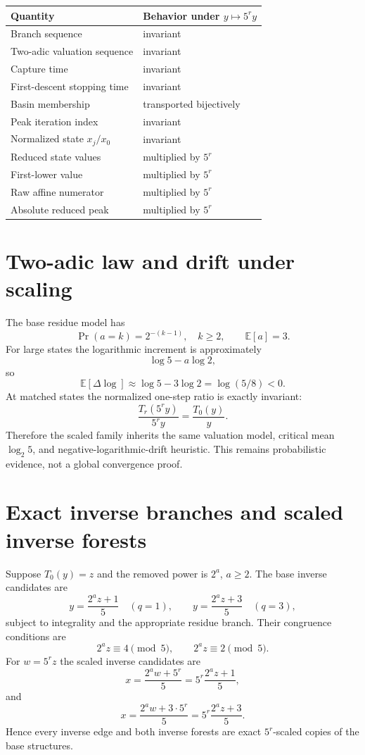 \documentclass[11pt]{article}
\theoremstyle{remark}\newtheorem{remark}{Remark}
\begin{document}
\begin{center}
\begin{tabular}{ll}
\toprule
Quantity & Behavior under $y\mapsto5^ry$\\\midrule
Branch sequence & invariant\\
Two-adic valuation sequence & invariant\\
Capture time & invariant\\
First-descent stopping time & invariant\\
Basin membership & transported bijectively\\
Peak iteration index & invariant\\
Normalized state $x_j/x_0$ & invariant\\
Reduced state values & multiplied by $5^r$\\
First-lower value & multiplied by $5^r$\\
Raw affine numerator & multiplied by $5^r$\\
Absolute reduced peak & multiplied by $5^r$\\\bottomrule
\end{tabular}
\end{center}

\section{Two-adic law and drift under scaling}
The base residue model has
\[
\Pr(a=k)=2^{-(k-1)},\quad k\ge2,\qquad \mathbb{E}[a]=3.
\]
For large states the logarithmic increment is approximately
\[
\log5-a\log2,
\]
so
\[
\mathbb{E}[\Delta\log]\approx\log5-3\log2=\log(5/8)<0.
\]
At matched states the normalized one-step ratio is exactly invariant:
\[
\frac{T_r(5^ry)}{5^ry}=\frac{T_0(y)}{y}.
\]
Therefore the scaled family inherits the same valuation model, critical mean $\log_2 5$, and negative-logarithmic-drift heuristic. This remains probabilistic evidence, not a global convergence proof.

\section{Exact inverse branches and scaled inverse forests}
Suppose $T_0(y)=z$ and the removed power is $2^a$, $a\ge2$. The base inverse candidates are
\[
y=\frac{2^az+1}{5}\quad(q=1),\qquad
y=\frac{2^az+3}{5}\quad(q=3),
\]
subject to integrality and the appropriate residue branch. Their congruence conditions are
\[
2^az\equiv4\pmod5,\qquad2^az\equiv2\pmod5.
\]
For $w=5^rz$ the scaled inverse candidates are
\[
x=\frac{2^aw+5^r}{5}=5^r\frac{2^az+1}{5},
\]
and
\[
x=\frac{2^aw+3\cdot5^r}{5}=5^r\frac{2^az+3}{5}.
\]
Hence every inverse edge and both inverse forests are exact $5^r$-scaled copies of the base structures.
\end{document}
